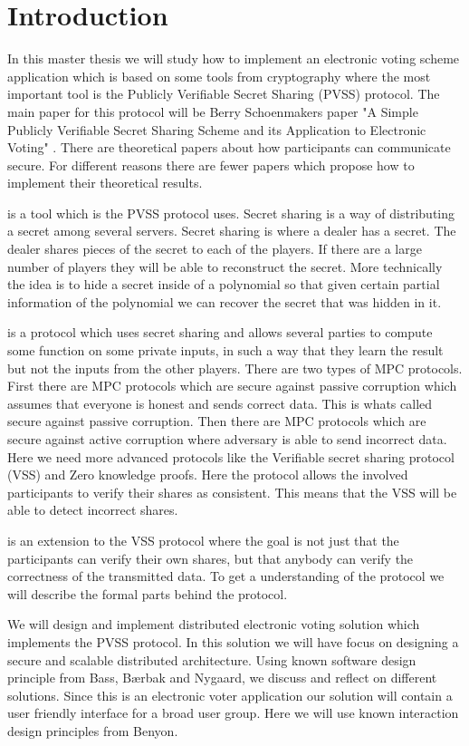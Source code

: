 \section{Introduction}
In this master thesis we will study how to implement an  electronic voting scheme application which is based on some tools from cryptography where the most important tool is the Publicly Verifiable Secret Sharing (PVSS) protocol. The main paper for this protocol will be Berry Schoenmakers paper "A Simple Publicly Verifiable Secret Sharing Scheme and its Application to Electronic Voting" \cite{Schoenmakers1999}. There are theoretical papers about how participants can communicate secure. For different reasons there are fewer papers which propose how to implement their theoretical results. 

 is a tool which is the PVSS protocol uses. Secret sharing is a way of distributing a secret among several servers. Secret sharing is where a dealer has a secret. The dealer shares pieces of the secret to each of the players. If there are a large number of players they will be able to reconstruct the secret. More technically the idea is to hide a secret inside of a polynomial so that given certain partial information of the polynomial we can recover the secret that was hidden in it.

 is a protocol which uses secret sharing and allows several parties to compute some function on some private inputs, in such a way that they learn the result but not the inputs from the other players. There are two types of MPC protocols. First there are MPC protocols which are secure against passive corruption which assumes that everyone is honest and sends correct data. This is whats called secure against passive corruption. Then there are MPC protocols which are secure against active corruption where adversary is able to send incorrect data. Here we need more advanced protocols like the Verifiable secret sharing protocol (VSS) and Zero knowledge proofs. Here the protocol allows the involved participants to verify their shares as consistent. This means that the VSS will be able to detect incorrect shares.

 is an extension to the VSS protocol where the goal is not just that the participants can verify their own shares, but that anybody can verify the correctness of the transmitted data. To get a understanding of the protocol we will describe the formal parts behind the protocol. 

 We will design and implement distributed electronic voting solution which implements the PVSS protocol. In this solution we will have focus on designing a secure and scalable distributed architecture. Using known software design principle from Bass, Bærbak and Nygaard, we discuss and reflect on different solutions. Since this is an electronic voter application our solution will contain a user friendly interface for a broad user group. Here we will use known interaction design principles from Benyon.

